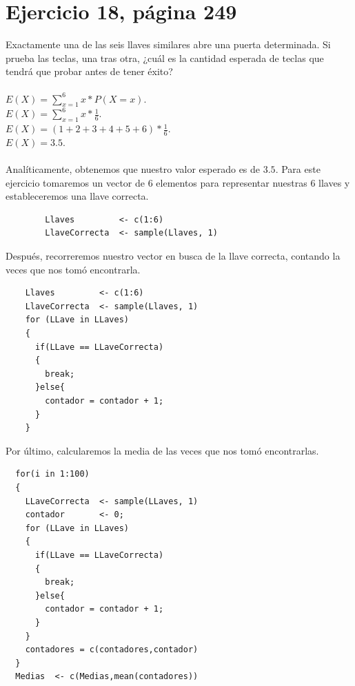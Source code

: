 \documentclass[]{article}
\begin{document}
    
\section{Ejercicio 18, página 249}


Exactamente una de las seis llaves similares abre una puerta determinada. Si prueba las teclas, una tras otra, ¿cuál es la cantidad esperada de teclas que tendrá que probar antes de tener éxito?\\
\\
$E(X) = \sum_{x = 1}^{6} x * P(X = x)$.\\
$E(X) = \sum_{x = 1}^{6} x * \frac{1}{6}$.\\
$E(X) = (1+2+3+4+5+6)* \frac{1}{6}$.\\
$E(X) = 3.5$.\\
\\
Analíticamente, obtenemos que nuestro valor esperado es de $3.5$.
Para este ejercicio tomaremos un vector de 6 elementos para representar nuestras 6 llaves y estableceremos una llave correcta.
      \begin{lstlisting}
		Llaves         <- c(1:6)
		LlaveCorrecta  <- sample(Llaves, 1)

      \end{lstlisting}
Después, recorreremos nuestro vector en busca de la llave correcta, contando la veces que nos tomó encontrarla.
      \begin{lstlisting}
	Llaves         <- c(1:6)
	LlaveCorrecta  <- sample(Llaves, 1)
    for (LLave in LLaves) 
    {
      if(LLave == LLaveCorrecta)
      {
        break;
      }else{
        contador = contador + 1;
      }
    }
      \end{lstlisting}
Por último, calcularemos la media de las veces que nos tomó encontrarlas.
           \begin{lstlisting}
  for(i in 1:100)
  {
    LLaveCorrecta  <- sample(LLaves, 1)
    contador       <- 0;
    for (LLave in LLaves) 
    {
      if(LLave == LLaveCorrecta)
      {
        break;
      }else{
        contador = contador + 1;
      }
    }
    contadores = c(contadores,contador)
  }
  Medias  <- c(Medias,mean(contadores))
      \end{lstlisting}
      
\end{document}
